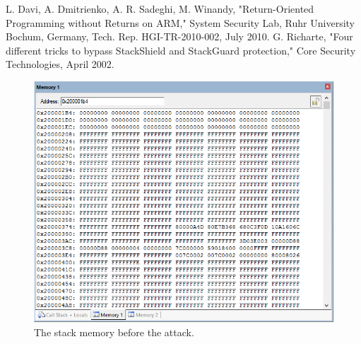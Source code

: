 \documentclass[letterpaper, 10 pt, conference]{ieeeconf}  %
\begin{document}
















\begin{thebibliography}{99}

 L. Davi, A. Dmitrienko, A. R. Sadeghi, M. Winandy, "Return-Oriented Programming without Returns on ARM," System Security Lab, Ruhr University Bochum, Germany, Tech. Rep. HGI-TR-2010-002, July 2010.
 G. Richarte, "Four different tricks to bypass StackShield and StackGuard protection," Core Security Technologies, April 2002.
 

\end{thebibliography}

\begin{figure}[thpb]
	\centering
	\includegraphics[scale=.5]{StackB4}
    \caption{The stack memory before the attack.}
\end{figure}
\end{document}
